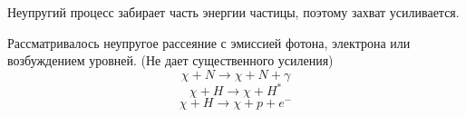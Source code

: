 Неупругий процесс забирает часть энергии частицы, поэтому захват усиливается. 

Рассматривалось неупругое рассеяние с эмиссией фотона, электрона или возбуждением уровней. (Не дает существенного усиления)
\begin{equation*}
	\chi + N \rightarrow \chi + N + \gamma
\end{equation*}
\begin{equation*}
	\chi + H \rightarrow \chi + H^*
\end{equation*}
\begin{equation*}
	\chi + H \rightarrow \chi + p + e^-
\end{equation*}
